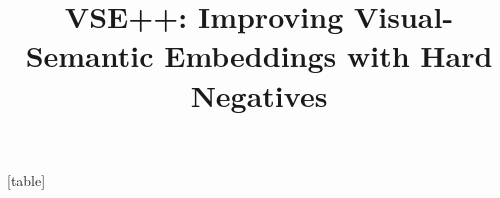 

\usepackage{graphicx}
\usepackage{url}
\usepackage{ragged2e}
\usepackage{times}
\usepackage{array}
\usepackage{amsmath}
\usepackage{amssymb}
\usepackage{caption}
\usepackage{subcaption}
\usepackage[inline]{enumitem}
\usepackage{float}
\usepackage{xcolor}
\usepackage{colortbl}
\usepackage{makecell}
\usepackage{xspace}
\usepackage{etoolbox}
\usepackage{tikz}
\DeclareMathOperator*{\argmax}{arg\,max}

\newcommand{\R}{\mathbb{R}}
\newcommand{\SUM}{\emph{SH}}
\newcommand{\MAX}{\emph{MH}}

\newcommand{\OC}{\emph{1C}}
\newcommand{\TC}{\emph{10C}}
\newcommand{\RC}{\emph{RC}}
\newcommand{\TCV}{\emph{10C+rV}}
\newcommand{\RCV}{\emph{RC+rV}}
\newcommand{\RV}{\emph{rV}}

\newcommand{\order}{\emph{Order}}
\newcommand{\orderz}{\emph{Order0}}
\newcommand{\orderpp}{\emph{Order++}}
\newcommand{\VSE}{\emph{UVS}}
\newcommand{\VSEpp}{\emph{VSE++}}
\newcommand{\VSEppFt}{\emph{VSE++ (FT)}}
\newcommand{\VSEppRes}{\emph{VSE++ (ResNet)}}
\newcommand{\VSEppResFt}{\emph{VSE++ (ResNet, FT)}}
\newcommand{\VSEz}{\emph{VSE0}}
\newcommand{\VSEzFt}{\emph{VSE0 (FT)}}
\newcommand{\VSEzRes}{\emph{VSE0 (ResNet)}}
\newcommand{\VSEzResFt}{\emph{VSE0 (ResNet, FT)}}




\newcommand{\coco}{MS-COCO}
\newcommand{\fthk}{Flickr30K}
 
\newcommand{\T}{\ensuremath{\top}} 
\captionsetup[subfigure]{subrefformat=simple,labelformat=simple}
\renewcommand\thesubfigure{(\alph{subfigure})}


[table]
\renewcommand{\therowcntr}{\the\numexpr\thetable+1.\arabic{rowcntr}}

\newcommand{\numrow}{\refstepcounter{rowcntr}\therowcntr}



\newcommand{\comment}[1]{}
\makeatletter
\def\blfootnote{\gdef\@thefnmark{}\@footnotetext}
\makeatother


\newcommand{\FF}[1]{{\color{blue}{[Fartash: #1]}}}
\newcommand{\JK}[1]{{\color{purple}{[Jamie: #1]}}}
\newcommand{\DF}[1]{{\color{cyan}{[David: #1]}}}
\newcommand{\SF}[1]{{\color{red}{[Sanja: #1]}}}




\title{VSE++: Improving Visual-Semantic
Embeddings with Hard Negatives}

